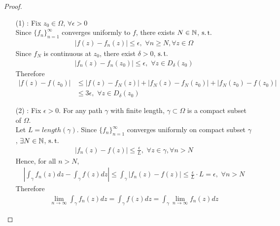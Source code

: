 \begin{thm}
		\newpage
		\begin{proof}
			\begin{enumerate}
				\item[(1)]: Fix $z_0 \in \Omega$, $\forall \epsilon > 0$\\
				Since $\{f_n\}_{n = 1}^{\infty}$ converges uniformly to $f$, there exists $N \in \mathbb{N}$, $\operatorname{s.t.}$
				\begin{align}
					\left| f(z) - f_{n}(z) \right| \leq \epsilon , \,\, \forall n \geq N , \forall z \in \Omega
				\end{align}
				Since $f_N$ is continuous at $z_0$, there exist $\delta > 0$, $\operatorname{s.t.}$
				\begin{align}
					\left| f_{n}(z) - f_{n}(z_0) \right| \leq \epsilon , \,\, \forall z \in D_{\delta}(z_0)
				\end{align}
				Therefore
				\begin{align}
					\left| f(z) - f(z_0) \right| 
					&\leq \left| f(z) - f_{N}(z) \right| + \left| f_{N}(z) - f_{N}(z_0) \right| + \left| f_{N}(z_0) - f(z_0) \right| \\
					&\leq 3 \epsilon , \,\, \forall z \in D_{\delta}(z_0)
				\end{align}
				
				\vspace{2em}
				
				\item[(2)]: Fix $\epsilon > 0$. For any path $\gamma$ with finite length, $\gamma \subset \Omega$ is a compact subset of $\Omega$.\\
				Let $L = length(\gamma)$. Since $\{ f_n \}_{n = 1}^{\infty}$ converges uniformly on compact subset $\gamma$, $\exists N \in \mathbb{N}$, $\operatorname{s.t.}$
				\begin{align}
					\left| f_{n}(z) - f(z) \right| \leq \frac{\epsilon}{L} , \,\, \forall z \in \gamma , \forall n > N
				\end{align}
				Hence, for all $n > N$,
				\begin{align}
					\left| \int_{\gamma}{f_{n}(z) dz} - \int_{\gamma}{f(z) dz} \right| \leq \int_{\gamma}{\left| f_{n}(z) - f(z) \right|} \leq \frac{\epsilon}{L} \cdot L = \epsilon , \,\, \forall n > N
				\end{align}
				Therefore
				\begin{align}
					\lim_{n \to \infty}{\int_{\gamma}{f_{n}(z) dz}} = \int_{\gamma}{f(z) dz} = \int_{\gamma}{\lim_{n \to \infty}{f_{n}(z) dz}}
				\end{align}
			

\end{enumerate}
\end{proof}
\end{thm}
